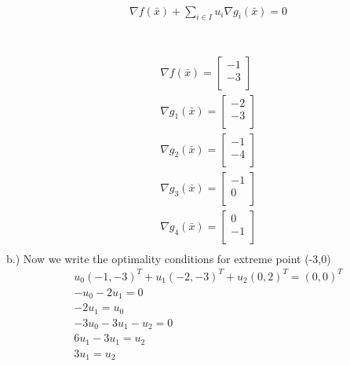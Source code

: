 \documentclass[12pt]{article}
\begin{document}
    \\
    \begin{align*}
        &\nabla f(\bar x) + \sum_{i \in I} u_i \nabla g_i(\bar x) = 0
    \end{align*}\\
    \\
    \begin{align*}
        &\nabla f(\bar x) = 
            \begin{bmatrix}
                -1\\
                -3\\
            \end{bmatrix}\\
        &\nabla g_1(\bar x) = 
            \begin{bmatrix}
                -2\\
                -3\\
            \end{bmatrix}\\
        &\nabla g_2(\bar x) = 
            \begin{bmatrix}
                -1\\
                -4\\
            \end{bmatrix}\\
        &\nabla g_3(\bar x) = 
            \begin{bmatrix}
                -1\\
                0\\
            \end{bmatrix}\\
        &\nabla g_4(\bar x) = 
            \begin{bmatrix}
                0\\
                -1\\
            \end{bmatrix}\\
    \end{align*}
    b.) Now we write the optimality conditions for extreme point (-3,0)\\
    \begin{align*}
        &u_0 (-1,-3)^T + u_1 (-2,-3)^T + u_2 (0,2)^T = (0,0)^T\\
        &-u_0 - 2u_1 = 0\\
        &-2u_1 = u_0\\
        &-3u_0 - 3u_1 - u_2 = 0\\
        &6u_1-3u_1 = u_2\\
        &3u_1 = u_2
    \end{align*}
\end{document}
